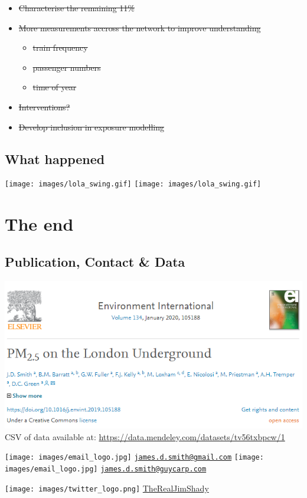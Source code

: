 \documentclass[]{article}
\providecommand{\tightlist}{%
  \setlength{\itemsep}{0pt}\setlength{\parskip}{0pt}}
\begin{document}
\begin{itemize}
\tightlist
\item
  \sout{Characterise the remaining 11\%}
\item
  \sout{More measurements accross the network to improve understanding}

  \begin{itemize}
  \tightlist
  \item
    \sout{train frequency}
  \item
    \sout{passenger numbers}
  \item
    \sout{time of year}
  \end{itemize}
\item
  \sout{Interventions?}
\item
  \sout{Develop inclusion in exposure modelling}
\end{itemize}

\hypertarget{what-happened}{%
\subsection{What happened}\label{what-happened}}

\texttt{[image: images/lola\_swing.gif]}
\texttt{[image: images/lola\_swing.gif]}

\hypertarget{the-end}{%
\section{The end}\label{the-end}}

\hypertarget{publication-contact-data}{%
\subsection{Publication, Contact \&
Data}\label{publication-contact-data}}

\includegraphics{images/tube_paper.png} CSV of data available at:
\url{https://data.mendeley.com/datasets/tv56txbpcw/1}

\texttt{[image: images/email\_logo.jpg]}
\href{mailto:james.d.smith@gmail.com}{\nolinkurl{james.d.smith@gmail.com}}
\texttt{[image: images/email\_logo.jpg]}
\href{mailto:james.d.smith@guycarp.com}{\nolinkurl{james.d.smith@guycarp.com}}

\texttt{[image: images/twitter\_logo.png]}
\href{http://twitter.com/therealjimshady}{TheRealJimShady}
\end{document}
